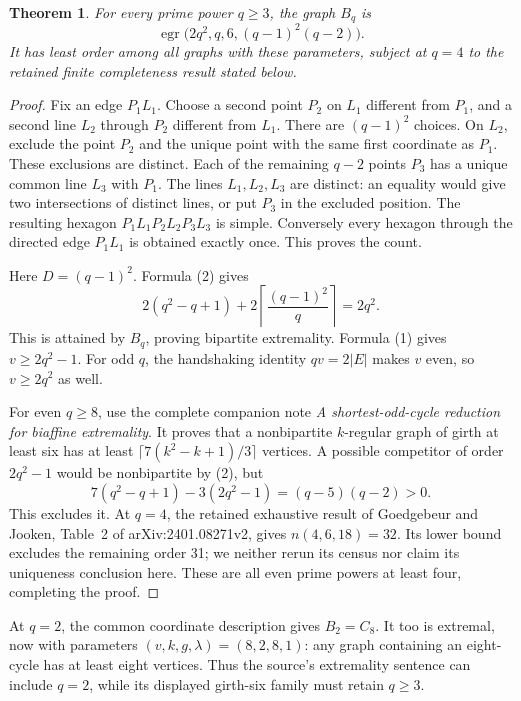 \documentclass[11pt,a4paper]{article}
\newtheorem{theorem}{Theorem}
\begin{document}
\begin{theorem}\label{biaffine}
For every prime power $q\geq3$, the graph $B_q$ is
\[
 \operatorname{egr}\bigl(2q^2,q,6,(q-1)^2(q-2)\bigr).
\]
It has least order among all graphs with these parameters, subject at
$q=4$ to the retained finite completeness result stated below.
\end{theorem}
\begin{proof}
Fix an edge $P_1L_1$. Choose a second point $P_2$ on $L_1$ different
from $P_1$, and a second line $L_2$ through $P_2$ different from $L_1$.
There are $(q-1)^2$ choices. On $L_2$, exclude the point $P_2$ and the
unique point with the same first coordinate as $P_1$. These exclusions
are distinct. Each of the remaining $q-2$ points $P_3$ has a unique
common line $L_3$ with $P_1$. The lines $L_1,L_2,L_3$ are distinct:
an equality would give two intersections of distinct lines, or put
$P_3$ in the excluded position. The resulting hexagon
$P_1L_1P_2L_2P_3L_3$ is simple. Conversely every hexagon through the
directed edge $P_1L_1$ is obtained exactly once. This proves the count.

Here $D=(q-1)^2$. Formula (2) gives
\[
 2(q^2-q+1)+2\left\lceil\frac{(q-1)^2}{q}\right\rceil=2q^2.
\]
This is attained by $B_q$, proving bipartite extremality. Formula (1)
gives $v\geq2q^2-1$. For odd $q$, the handshaking identity $qv=2|E|$
makes $v$ even, so $v\geq2q^2$ as well.

For even $q\geq8$, use the complete companion note
\emph{A shortest-odd-cycle reduction for biaffine extremality}.
It proves that a nonbipartite $k$-regular graph of girth at least six
has at least $\lceil7(k^2-k+1)/3\rceil$ vertices. A possible
competitor of order $2q^2-1$ would be nonbipartite by (2), but
\[
7(q^2-q+1)-3(2q^2-1)=(q-5)(q-2)>0.
\]
This excludes it. At $q=4$, the retained exhaustive result of
Goedgebeur and Jooken, Table~2 of arXiv:2401.08271v2, gives
$n(4,6,18)=32$. Its lower bound excludes the remaining order 31;
we neither rerun its census nor claim its uniqueness conclusion here.
These are all even prime powers at least four, completing the proof.
\end{proof}
At $q=2$, the common coordinate description gives $B_2=C_8$.
It too is extremal, now with parameters $(v,k,g,\lambda)=(8,2,8,1)$:
any graph containing an eight-cycle has at least eight vertices.
Thus the source's extremality sentence can include $q=2$, while its
displayed girth-six family must retain $q\geq3$.
\end{document}
